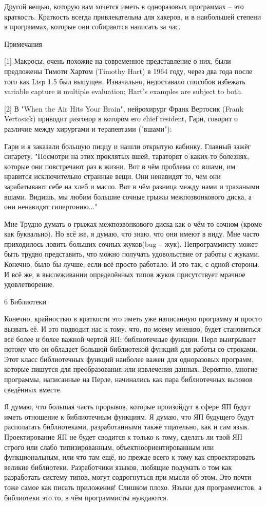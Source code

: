 \documentclass[ebook,12pt,oneside,openany]{memoir}
\begin{document}
Другой вещью, которую вам хочется иметь в одноразовых программах --
это краткость. Краткость всегда привлекательна для хакеров, и в
наибольшей степени в программах, которые они собираются написать за
час.



Примечания

[1] Макросы, очень похожие на современное представление о них, были
предложены Тимоти Хартом (Timothy Hart) в 1964 году, через два года
после того как Lisp 1.5 был выпущен. Изначально, недоставало способов
избежать variable capture и multiple evaluation; Hart's examples are
subject to both.

[2] В "When the Air Hits Your Brain", нейрохирург Франк Вертосик
(Frank Vertosick) приводит разговор в котором его chief resident,
Гари, говорит о различие между хирургами и терапевтами ("вшами"):

Гари и я заказали большую пиццу и нашли открытую кабинку. Главный
зажёг сигарету. "Посмотри на этих проклятых вшей, тараторят о каких-то
болезнях, которые они повстречают раз в жизни. Вот в чём проблема со
вшами, им нравится исключительно странные вещи. Они ненавидят то, чем
они зарабатывают себе на хлеб и масло. Вот в чём разница между нами и
трахаными вшами. Видишь, мы любим большие сочные грыжы межпозвонкового
диска, а они ненавидят гипертонию..."

Мне Трудно думать о грыжах межпозвонкового диска как о чём-то сочном
(кроме как буквально). Но всё же, я думаю, что знаю, что они имеют в
виду. Мне часто приходилось ловить больших сочных жуков(bug -- жук).
Непрограммисту может быть трудно представить, что можно получать
удовольствие от работы с жуками. Конечно, было бы лучше, если всё
просто работало. И это так, с одной стороны. И всё же, в выслеживании
определённых типов жуков присутствует мрачное удовлетворение.

6 Библиотеки

Конечно, крайностью в краткости это иметь уже написанную программу и
просто вызвать её. И это подводит нас к тому, что, по моему мнению,
будет становиться всё более и более важной чертой ЯП: библиотечные
функции. Перл выигрывает потому что он обладает большой библиотекой
функций для работы со строками. Этот класс библиотечных функций
наиболее важен для одноразовых программ, которые пишутся для
преобразования или извлечения данных. Вероятно, многие программы,
написанные на Перле, начинались как пара библиотечных вызовов
сведённых вместе.

Я думаю, что большая часть прорывов, которые произойдут в сфере ЯП
будут иметь отношение к библиотечным функциям. Я думаю, что ЯП
будущего будут располагать библиотеками, разработанными также
тщательно, как и сам язык. Проектирование ЯП не будет сводится к
только к тому, сделать ли твой ЯП строго или слабо типизированным,
объектноориентированным или функциональным, или что там ещё, но прежде
всего к тому как спроектировать великие библиотеки. Разработчики
языков, любящие подумать о том как разработать систему типов, могут
содрогнуться при мысли об этом. Это почти тоже самое как писать
приложения! Слишком плохо. Языки для программистов, а библиотеки это
то, в чём программисты нуждаются.
\end{document}

